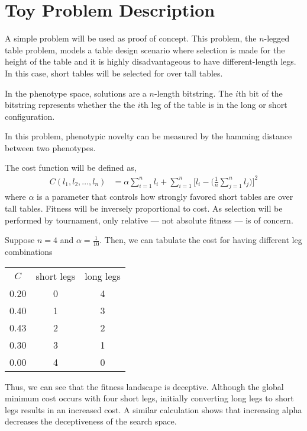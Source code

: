 \section{Toy Problem Description} \label{sec:problem-description}

A simple problem will be used as proof of concept.
This problem, the $n$-legged table problem, models a table design scenario where selection is made for the height of the table and it is highly disadvantageous to have different-length legs.
In this case, short tables will be selected for over tall tables.

In the phenotype space, solutions are a $n$-length bitstring.
The $i$th bit of the bitstring represents whether the the $i$th leg of the table is in the long or short configuration.

In this problem, phenotypic novelty can be measured by the hamming distance between two phenotypes.

The cost function will be defined as,
\begin{align*}
C(l_1, l_2, \ldots, l_n)
&=
\alpha \sum_{i = 1}^{n} l_i
+
\sum_{i=1}^n \Big[l_i - \Big(\frac{1}{n} \sum_{j=1}^n l_j\Big)\Big]^2
\end{align*}
where $\alpha$ is a parameter that controls how strongly favored short tables are over tall tables.
Fitness will be inversely proportional to cost.
As selection will be performed by tournament, only relative --- not absolute fitness --- is of concern.

Suppose $n=4$ and $\alpha = \frac{1}{10}$.
Then, we can tabulate the cost for having different leg combinations
\begin{center}
\begin{tabular}{ c c c }
 $C$ & short legs & long legs \\
 0.20 & 0 & 4 \\
 0.40 & 1 & 3 \\
 0.43 & 2 & 2 \\
 0.30 & 3 & 1 \\
 0.00 & 4 & 0
\end{tabular}
\end{center}
Thus, we can see that the fitness landscape is deceptive.
Although the global minimum cost occurs with four short legs, initially converting long legs to short legs results in an increased cost.
A similar calculation shows that increasing alpha decreases the deceptiveness of the search space.
